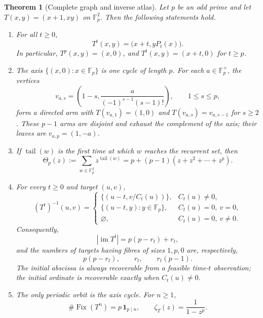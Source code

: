 \documentclass[10pt,a4paper]{amsart}
\newtheorem{theorem}{Theorem}
\theoremstyle{remark}
\newcommand{\F}{\mathbb F}
\newcommand{\Fix}{\operatorname{Fix}}
\newcommand{\im}{\operatorname{im}}
\newcommand{\tail}{\operatorname{tail}}
\begin{document}
\begin{theorem}[Complete graph and inverse atlas]\label{thm:main}
Let \(p\) be an odd prime and let \(T(x,y)=(x+1,xy)\) on \(\F_p^2\).
Then the following statements hold.
\begin{enumerate}[label=\textup{(\roman*)},leftmargin=*,itemsep=2pt]
\item For all \(t\geq0\),
\[
 T^t(x,y)=\bigl(x+t,yP_t(x)\bigr).
\]
In particular, \(T^p(x,y)=(x,0)\), and
\(T^t(x,y)=(x+t,0)\) for \(t\geq p\).
\item The axis \(\{(x,0):x\in\F_p\}\) is one cycle of length \(p\).
For each \(a\in\F_p^\times\), the vertices
\[
 v_{a,s}=\left(1-s,\frac{a}{(-1)^{s-1}(s-1)!}\right),
 \qquad 1\leq s\leq p,
\]
form a directed arm with
\(T(v_{a,1})=(1,0)\) and
\(T(v_{a,s})=v_{a,s-1}\) for \(s\geq2\).
These \(p-1\) arms are disjoint and exhaust the complement of the axis;
their leaves are \(v_{a,p}=(1,-a)\).
\item If \(\tail(w)\) is the first time at which \(w\) reaches the
recurrent set, then
\[
 \Theta_p(z):=\sum_{w\in\F_p^2}z^{\tail(w)}
 =p+(p-1)(z+z^2+\cdots+z^p).
\]
\item For every \(t\geq0\) and target \((u,v)\),
\[
 (T^t)^{-1}(u,v)=
 \begin{cases}
 \{(u-t,v/C_t(u))\},&C_t(u)\neq0,\\
 \{(u-t,y):y\in\F_p\},&C_t(u)=0,\ v=0,\\
 \varnothing,&C_t(u)=0,\ v\neq0.
 \end{cases}                                      \tag{1}\label{eq:fibre}
\]
Consequently,
\[
 |\im T^t|=p(p-r_t)+r_t,                           \tag{2}\label{eq:image}
\]
and the numbers of targets having fibres of sizes \(1,p,0\) are,
respectively,
\[
 p(p-r_t),\qquad r_t,\qquad r_t(p-1).              \tag{3}\label{eq:dist}
\]
The initial abscissa is always recoverable from a feasible time-\(t\)
observation; the initial ordinate is recoverable exactly when
\(C_t(u)\neq0\).
\item The only periodic orbit is the axis cycle.  For \(n\geq1\),
\[
 \#\Fix(T^n)=p\,\mathbf 1_{p\mid n},\qquad
 \zeta_T(z)=\frac{1}{1-z^p}.
\]
\end{enumerate}
\end{theorem}
\end{document}
